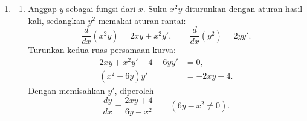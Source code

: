 \documentclass[10pt,letterpaper]{article}
\begin{document}
\begin{enumerate}
\begin{enumerate}
          \item Grafik sama dengan parabola $y=x^2+x+1$, kecuali titik pada $x=1$.
                Titik $(1,3)$ harus dikosongkan karena fungsi semula tidak terdefinisi di sana.
                Bentuk puncaknya adalah
                \[
                  y=\left(x+\frac12\right)^2+\frac34.
                \]
                Jadi, puncaknya $(-\frac12,\frac34)$ dan parabola terbuka ke atas.
                Titik potong sumbu-$y$ adalah $(0,1)$.
                Tidak ada titik potong sumbu-$x$ karena nilai minimum parabolanya positif.
                \begin{center}
                \end{center}
        \end{enumerate}

  \item \begin{enumerate}
          \item Anggap $y$ sebagai fungsi dari $x$.
                Suku $x^2y$ diturunkan dengan aturan hasil kali, sedangkan $y^2$ memakai aturan rantai:
                \[
                  \frac{d}{dx}(x^2y)=2xy+x^2y',\qquad
                  \frac{d}{dx}(y^2)=2yy'.
                \]
                Turunkan kedua ruas persamaan kurva:
                \begin{align*}
                  2xy+x^2y'+4-6yy' & =0,      \\
                  (x^2-6y)y'       & =-2xy-4.
                \end{align*}
                Dengan memisahkan $y'$, diperoleh
                \[
                  \boxed{\frac{dy}{dx}=\frac{2xy+4}{6y-x^2}}
                  \qquad(6y-x^2\ne0).
                \]


\end{enumerate}
\end{enumerate}
\end{document}
